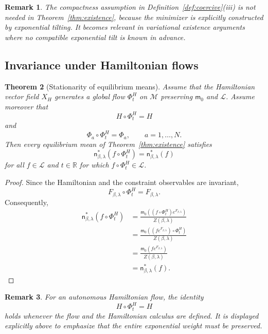 \documentclass[11pt,reqno]{amsart}
\newtheorem{Theorem}{Theorem}[section]
\newtheorem{rem}[Theorem]{Remark}
\begin{document}
\begin{rem}
The compactness assumption in
Definition~\ref{def:coercive}\textup{(iii)} is not needed in
Theorem~\ref{thm:existence}, because the minimizer is explicitly
constructed by exponential tilting. It becomes relevant in variational
existence arguments where no compatible exponential tilt is known in
advance.
\end{rem}

\subsection{Invariance under Hamiltonian flows}

\begin{Theorem}[Stationarity of equilibrium means]
\label{thm:stationarity}
Assume that the Hamiltonian vector field $X_H$ generates a global flow
$\Phi_t^H$ on $\mathcal M$ preserving $\mathsf m_0$ and $\mathcal L$.
Assume moreover that
\[
H\circ\Phi_t^H=H
\]
and
\[
\Phi_a\circ\Phi_t^H=\Phi_a,
\qquad
a=1,\ldots,N.
\]
Then every equilibrium mean of Theorem~\ref{thm:existence} satisfies
\[
\mathsf n_{\beta,\lambda}^{*}(f\circ\Phi_t^H)
=
\mathsf n_{\beta,\lambda}^{*}(f)
\]
for all $f\in\mathcal L$ and $t\in\mathbb R$ for which
$f\circ\Phi_t^H\in\mathcal L$.
\end{Theorem}

\begin{proof}
Since the Hamiltonian and the constraint observables are invariant,
\[
F_{\beta,\lambda}\circ\Phi_t^H
=
F_{\beta,\lambda}.
\]
Consequently,
\begin{align*}
\mathsf n_{\beta,\lambda}^{*}(f\circ\Phi_t^H)
&=
\frac{
\mathsf m_0\left(
(f\circ\Phi_t^H)e^{F_{\beta,\lambda}}
\right)
}{
Z(\beta,\lambda)
}
\\
&=
\frac{
\mathsf m_0\left(
(fe^{F_{\beta,\lambda}})\circ\Phi_t^H
\right)
}{
Z(\beta,\lambda)
}
\\
&=
\frac{
\mathsf m_0\left(
fe^{F_{\beta,\lambda}}
\right)
}{
Z(\beta,\lambda)
}
\\
&=
\mathsf n_{\beta,\lambda}^{*}(f).
\end{align*}
\end{proof}

\begin{rem}
For an autonomous Hamiltonian flow, the identity
\[
H\circ\Phi_t^H=H
\]
holds whenever the flow and the Hamiltonian calculus are defined. It is
displayed explicitly above to emphasize that the entire exponential
weight must be preserved.
\end{rem}
\end{document}
